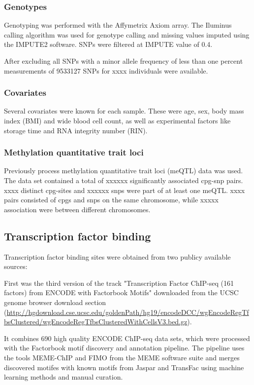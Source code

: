 \documentclass[a4paper,12pt]{article}
\begin{document}
\subsubsection{Genotypes}
Genotyping was performed with the Affymetrix Axiom array. The Iluminus calling algorithm was used for genotype calling and missing values imputed using the IMPUTE2 software\cite{10.1371/journal.pgen.1000529}. SNPs were filtered at IMPUTE value of 0.4. 

After excluding all SNPs with a minor allele frequency of less than one percent measurements of 9533127 SNPs for xxxx individuals were available. 

\subsubsection{Covariates}
Several covariates were known for each sample. These were age, sex, body mass index (BMI) and wide blood cell count, as well as experimental factors like storage time and RNA integrity number (RIN).

\subsubsection{Methylation quantitative trait loci}
Previously process methylation quantitative trait loci (meQTL) data was used. The data set contained a total of xxxxxx significantly associated cpg-snp pairs. 
xxxx distinct cpg-sites and xxxxxx snps were part of at least one meQTL. xxxx pairs consisted of cpgs and snps on the same chromosome, while xxxxx association were between different chromosomes. 

\subsection{Transcription factor binding}
Transcription factor binding sites were obtained from two publicy available sources: 

First was the third version of the track "Transcription Factor ChIP-seq (161 factors) from ENCODE with Factorbook Motifs"\cite{10.1101/gr.139105.112} downloaded from the UCSC genome browser download section (\url{http://hgdownload.cse.ucsc.edu/goldenPath/hg19/encodeDCC/wgEncodeRegTfbsClustered/wgEncodeRegTfbsClusteredWithCellsV3.bed.gz}).

It combines 690 high quality ENCODE ChIP-seq data sets, which were processed with the Factorbook motif discovery and annotation pipeline\cite{doi:10.1093/nar/gku1280}. The pipeline uses the tools MEME-ChIP\cite{doi:10.1093/bioinformatics/btr189} and FIMO\cite{doi:10.1093/bioinformatics/btr064} from the MEME software suite and merges discovered motifes with known motifs from Jaspar\cite{} and TransFac\cite{} using machine learning methods and manual curation. 
\end{document}
